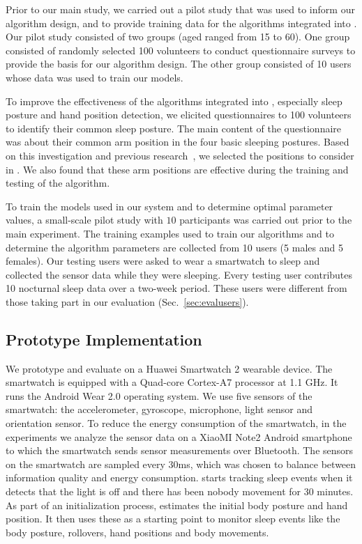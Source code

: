 Prior to our main study, we carried out a pilot study that was used to inform our algorithm design, and to provide training data for the algorithms integrated into {\systemname}. Our pilot study consisted of two groups (aged ranged from 15 to 60). One group   {consisted of} randomly selected 100 volunteers to conduct questionnaire surveys to provide the basis for our algorithm design. The other group consisted of 10 users whose data was used to train our models.


To improve the effectiveness of the algorithms integrated into {\systemname}, especially sleep posture and hand position detection, we elicited questionnaires to 100 volunteers to identify their common sleep posture. The main content of the questionnaire was about their common arm position in the four basic sleeping postures. Based on this investigation and previous research~\cite{position2014,HandPosition2}, we selected the positions to consider in {\systemname}. We also found that these arm positions are effective during the training and testing of the algorithm.

To train the models used in our system and to determine optimal parameter values, a small-scale pilot study with $10$ participants was carried out prior to the main experiment. The training examples used to train our algorithms and to determine the algorithm parameters are collected from 10 users (5 males and 5 females). Our testing users were asked to wear a smartwatch to sleep and collected the sensor data while they were sleeping. Every testing user contributes 10 nocturnal sleep data over a two-week period. These users were different from those taking part in our evaluation (Sec.~\ref{sec:evalusers}).



\subsection{Prototype Implementation \label{sec:implementation}}
We prototype and evaluate {\systemname} on a Huawei Smartwatch 2 wearable device. The smartwatch is equipped with a Quad-core Cortex-A7 processor at 1.1 GHz. It runs the Android Wear 2.0 operating system. We use five sensors of the smartwatch: the accelerometer, gyroscope, microphone, light sensor and orientation sensor. To reduce the energy consumption of the smartwatch, in the experiments we analyze the sensor data on a XiaoMI Note2 Android smartphone to which the smartwatch sends sensor measurements over Bluetooth. The sensors on the smartwatch are sampled every $30$ms, which was chosen to balance between information quality and energy consumption. {\systemname} starts tracking sleep events when it detects that the light is off and there has been nobody movement for 30 minutes. As part of an initialization process, {\systemname} estimates the initial body posture and hand position. It then uses these as a starting point to monitor sleep events like the body posture, rollovers, hand positions and body movements.
